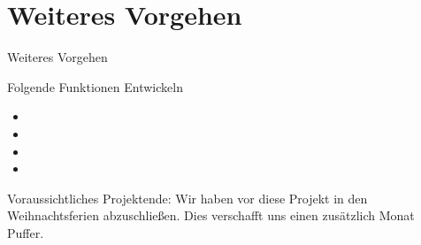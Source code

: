 \documentclass{beamer}
\begin{document}
\section{Weiteres Vorgehen}

\begin{frame}{Weiteres Vorgehen}
\begin{block}{Folgende Funktionen Entwickeln}
\begin{itemize}
\item 
\item 
\item 
\item 
\end{itemize}
\end{block}

\begin{block}{Voraussichtliches Projektende:}
Wir haben vor diese Projekt in den Weihnachtsferien abzuschließen.
Dies verschafft uns einen zusätzlich Monat Puffer.
\end{block}
\end{frame}
\end{document}

